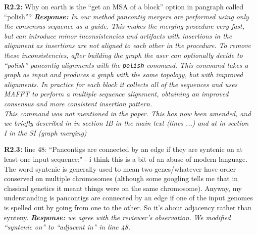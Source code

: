 \documentclass[aps,rmp,onecolumn]{revtex4-1}
\newcommand{\Marco}[1]{{\color{gray}Marco: #1}}
\newcommand{\Liam}[1]{{\color{teal}Liam: #1}}
\newcommand{\reviewer}[2]{\textbf{#1:} #2\vskip 5mm}
\newcommand{\response}[1]{{\it {\color{response}\textbf{Response:} #1}}\vskip 5mm}
\begin{document}
\reviewer{R2.2}{Why on earth is the ``get an MSA of a block'' option in pangraph called ``polish''?}
\response{In our method pancontig mergers are performed using only the consensus sequence as a guide. This makes the merging procedure very fast, but can introduce minor inconsistencies and artifacts with insertions in the alignment as insertions are not aligned to each other in the procedure.
      To remove these inconsistencies, after building the graph the user can optionally decide to ``polish'' pancontig alignments with the \texttt{polish} command. This command takes a graph as input and produces a graph with the same topology, but with improved alignments. In practice for each block it collects all of the sequences and uses MAFFT \cite{katoh2002mafft} to perform a multiple sequence alignment, obtaining an improved consensus and more consistent insertion pattern.\\
      This command was not mentioned in the paper. This has now been amended, and we briefly described in in section IB in the main text (lines ...) and at in section I in the SI (graph merging) }

\reviewer{R2.3}{line 48: ``Pancontigs are connected by an edge if they are syntenic on at least one input sequence;" - i think this is a bit of an abuse of modern language. The word syntenic is generally used to mean two genes/whatever have order conserved on multiple chromosomes (although some googling tells me that in classical genetics it meant things were on the same chromosome). Anyway, my understanding is pancontigs are connected by an edge if one of the input genomes is spelled out by going from one to the other. So it's about adjacency rather than synteny.}
\response{we agree with the reviewer's observation. We modified ``syntenic on'' to ``adjacent in'' in line 48.}
\end{document}
